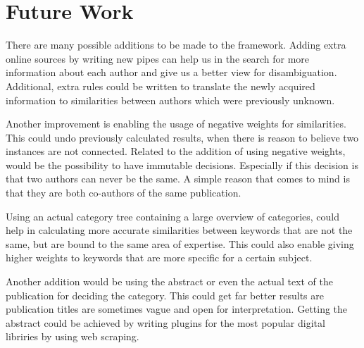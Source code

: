 \section{Future Work}

There are many possible additions to be made to the framework. Adding extra online sources by writing new pipes can help us in the search for more information about each author and give us a better view for disambiguation. Additional, extra rules could be written to translate the newly acquired information to similarities between authors which were previously unknown.

Another improvement is enabling the usage of negative weights for similarities. This could undo previously calculated results, when there is reason to believe two instances are not connected. Related to the addition of using negative weights, would be the possibility to have immutable decisions. Especially if this decision is that two authors can never be the same. A simple reason that comes to mind is that they are both co-authors of the same publication.

Using an actual category tree containing a large overview of categories, could help in calculating more accurate similarities between keywords that are not the same, but are bound to the same area of expertise. This could also enable giving higher weights to keywords that are more specific for a certain subject.

Another addition would be using the abstract or even the actual text of the publication for deciding the category. This could get far better results are publication titles are sometimes vague and open for interpretation. Getting the abstract could be achieved by writing plugins for the most popular digital libriries by using web scraping.

% 